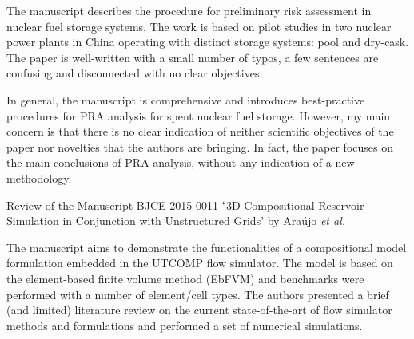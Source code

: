 \documentclass[14pt,twoside]{report}
\begin{document}
{{\medskip

The manuscript describes the procedure for preliminary risk assessment in nuclear fuel storage systems. The work is based on pilot studies in two nuclear power plants in China operating with distinct storage systems: pool and dry-cask. The paper is well-written with a small number of typos, a few sentences are confusing and disconnected with no clear objectives. 

In general, the manuscript is comprehensive and introduces best-practive procedures for PRA analysis for spent nuclear fuel storage.  However, my main concern is that there is no clear indication of neither scientific objectives of the paper nor novelties that the authors are bringing. In fact, the paper focuses on the main conclusions of PRA analysis, without any indication of a new methodology.  


\afterpage{%
    \clearpage%
    \thispagestyle{empty}%
    \begin{landscape}%
        \centering %
        \vfill
    \end{landscape}
    \clearpage%
}
\vfill
\clearpage


\begin{center}
  {\Large Review of the Manuscript BJCE-2015-0011 $\lq$3D Compositional Reservoir Simulation in Conjunction with Unstructured Grids' by Ara\'ujo {\it et al.}}
\end{center}

\medskip

The manuscript aims to demonstrate the functionalities of a compositional model formulation embedded in the UTCOMP flow simulator. The model is based on the element-based finite volume method (EbFVM) and benchmarks were performed with a number of element/cell types. The authors presented a brief (and limited) literature review on the current state-of-the-art of flow simulator methods and formulations and performed a set of numerical simulations. 

}}
\end{document}
